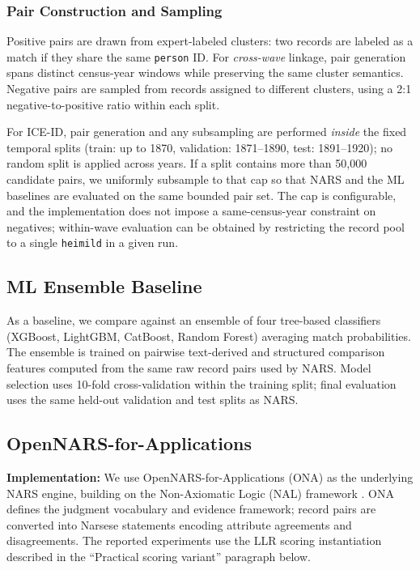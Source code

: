 \documentclass{article}
\begin{document}
\subsubsection{Pair Construction and Sampling}
Positive pairs are drawn from expert-labeled clusters: two records are labeled as a match if they share the same \texttt{person} ID. For \emph{cross-wave} linkage, pair generation spans distinct census-year windows while preserving the same cluster semantics. Negative pairs are sampled from records assigned to different clusters, using a 2:1 negative-to-positive ratio within each split.

For ICE-ID, pair generation and any subsampling are performed \emph{inside} the fixed temporal splits (train: up to 1870, validation: 1871--1890, test: 1891--1920); no random split is applied across years. If a split contains more than 50,000 candidate pairs, we uniformly subsample to that cap so that NARS and the ML baselines are evaluated on the same bounded pair set. The cap is configurable, and the implementation does not impose a same-census-year constraint on negatives; within-wave evaluation can be obtained by restricting the record pool to a single \texttt{heimild} in a given run.

\subsection{ML Ensemble Baseline}

As a baseline, we compare against an ensemble of four tree-based classifiers (XGBoost, LightGBM, CatBoost, Random Forest) averaging match probabilities. The ensemble is trained on pairwise text-derived and structured comparison features computed from the same raw record pairs used by NARS. Model selection uses 10-fold cross-validation within the training split; final evaluation uses the same held-out validation and test splits as NARS.

\subsection{OpenNARS-for-Applications}

\textbf{Implementation:} We use OpenNARS-for-Applications (ONA) \cite{hammer} as the underlying NARS engine, building on the Non-Axiomatic Logic (NAL) framework \cite{wang}. ONA defines the judgment vocabulary and evidence framework; record pairs are converted into Narsese statements encoding attribute agreements and disagreements. The reported experiments use the LLR scoring instantiation described in the ``Practical scoring variant'' paragraph below.
\end{document}
